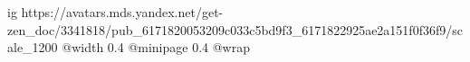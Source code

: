  
 
 
 
 

\ifcmt
  ig https://avatars.mds.yandex.net/get-zen_doc/3341818/pub_6171820053209c033c5bd9f3_6171822925ae2a151f0f36f9/scale_1200
  @width 0.4
  @minipage 0.4
  @wrap \parpic[r]
\fi
